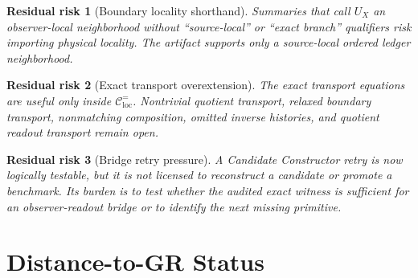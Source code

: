 \documentclass[11pt]{article}
\newtheorem{residualrisk}{Residual risk}
\begin{document}
\begin{residualrisk}[Boundary locality shorthand]
Summaries that call \(U_X\) an observer-local neighborhood without
``source-local'' or ``exact branch'' qualifiers risk importing
physical locality. The artifact supports only a source-local ordered
ledger neighborhood.
\end{residualrisk}

\begin{residualrisk}[Exact transport overextension]
The exact transport equations are useful only inside
\(\mathcal{C}^{=}_{\mathrm{loc}}\). Nontrivial quotient transport,
relaxed boundary transport, nonmatching composition, omitted inverse
histories, and quotient readout transport remain open.
\end{residualrisk}

\begin{residualrisk}[Bridge retry pressure]
A Candidate Constructor retry is now logically testable, but it is not
licensed to reconstruct a candidate or promote a benchmark. Its burden
is to test whether the audited exact witness is sufficient for an
observer-readout bridge or to identify the next missing primitive.
\end{residualrisk}

\section{Distance-to-GR Status}
\end{document}
